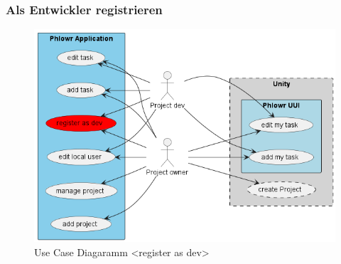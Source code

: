 \subsubsection{Als Entwickler registrieren}

\begin{figure}[H]
    \begin{center}
      \includegraphics[width=0.3\linewidth]{../content/diagrams/usecase/overview/overviewUseCaseRegisterAsDevSelected.png}
      \caption{Use Case Diagaramm <register as dev> }
    \end{center}
  \end{figure}

